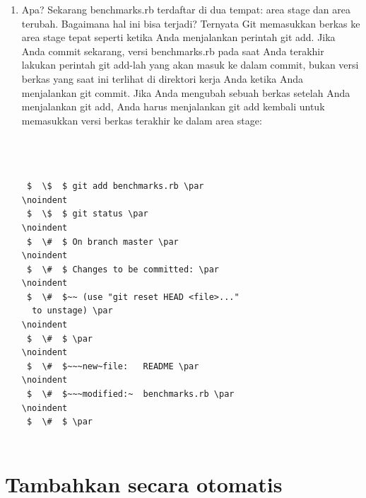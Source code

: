 \begin{enumerate}
\item Apa? Sekarang benchmarks.rb terdaftar di dua tempat: area stage dan area terubah. Bagaimana hal ini bisa terjadi? Ternyata Git memasukkan berkas ke area stage tepat seperti ketika Anda menjalankan perintah git add. Jika Anda commit sekarang, versi benchmarks.rb pada saat Anda terakhir lakukan perintah git add-lah yang akan masuk ke dalam commit, bukan versi berkas yang saat ini terlihat di direktori kerja Anda ketika Anda menjalankan git commit. Jika Anda mengubah sebuah berkas setelah Anda menjalankan git add, Anda harus menjalankan git add kembali untuk memasukkan versi berkas terakhir ke dalam area stage: \par
\vspace{12pt}
\vspace{12pt}
\noindent 

\begin{verbatim}



 $  \$  $ git add benchmarks.rb \par
\noindent 
 $  \$  $ git status \par
\noindent 
 $  \#  $ On branch master \par
\noindent 
 $  \#  $ Changes to be committed: \par
\noindent 
 $  \#  $~~ (use "git reset HEAD <file>..."
  to unstage) \par
\noindent 
 $  \#  $ \par
\noindent 
 $  \#  $~~~new~file:   README \par
\noindent 
 $  \#  $~~~modified:~  benchmarks.rb \par
\noindent 
 $  \#  $ \par
 
 \end{verbatim}
 
\vspace{12pt}
\vspace{12pt}
\noindent 


\end{enumerate}

\section{Tambahkan secara otomatis}

